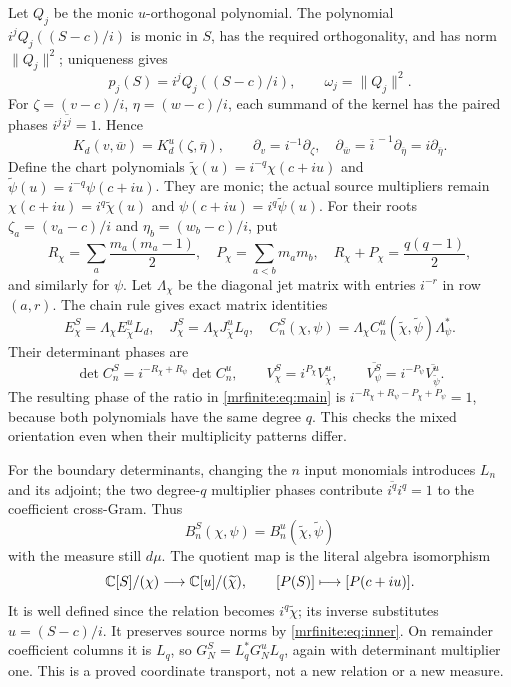 Let \(Q_j\) be the monic \(u\)-orthogonal polynomial. The polynomial
\(i^jQ_j((S-c)/i)\) is monic in \(S\), has the required
orthogonality, and has norm \(\|Q_j\|^2\); uniqueness gives
\[
 p_j(S)=i^jQ_j((S-c)/i),\qquad \omega_j=\|Q_j\|^2.
\]
For \(\zeta=(v-c)/i\), \(\eta=(w-c)/i\), each summand of the kernel
has the paired phases \(i^j\overline{i^j}=1\). Hence
\[
 K_d(v,\overline w)=K_d^u(\zeta,\overline\eta),\qquad
 \partial_v=i^{-1}\partial_\zeta,\quad
 \partial_{\overline w}=\overline{i}^{\,-1}\partial_{\overline\eta}
                         =i\partial_{\overline\eta}.
\]
Define the chart polynomials
\(\widetilde\chi(u)=i^{-q}\chi(c+iu)\) and
\(\widetilde\psi(u)=i^{-q}\psi(c+iu)\). They are monic; the actual
source multipliers remain
\(\chi(c+iu)=i^q\widetilde\chi(u)\) and
\(\psi(c+iu)=i^q\widetilde\psi(u)\).
For their roots \(\zeta_a=(v_a-c)/i\) and
\(\eta_b=(w_b-c)/i\), put
\[
 R_\chi=\sum_a\frac{m_a(m_a-1)}2,\quad
 P_\chi=\sum_{a<b}m_am_b,\quad
 R_\chi+P_\chi=\frac{q(q-1)}2,
\]
and similarly for \(\psi\). Let \(\Lambda_\chi\) be the diagonal
jet matrix with entries \(i^{-r}\) in row \((a,r)\).
The chain rule gives exact matrix identities
\begin{equation}\label{mrfinite:eq:jetphases}
 E_\chi^S=\Lambda_\chi E_{\widetilde\chi}^{u}L_d,
 \quad J_\chi^S=\Lambda_\chi J_{\widetilde\chi}^{u}L_q,
 \quad C_n^S(\chi,\psi)
       =\Lambda_\chi C_n^u(\widetilde\chi,\widetilde\psi)
                          \Lambda_\psi^*.
\end{equation}
Their determinant phases are
\[
 \det C_n^S=i^{-R_\chi+R_\psi}\det C_n^u,\qquad
 V_\chi^S=i^{P_\chi}V_{\widetilde\chi}^{u},\qquad
 \overline{V_\psi^S}=i^{-P_\psi}\overline{V_{\widetilde\psi}^{u}}.
\]
The resulting phase of the ratio in \eqref{mrfinite:eq:main} is
\(i^{-R_\chi+R_\psi-P_\chi+P_\psi}=1\), because both polynomials
have the same degree \(q\). This checks the mixed orientation even
when their multiplicity patterns differ.

For the boundary determinants, changing the \(n\) input monomials
introduces \(L_n\) and its adjoint; the two degree-\(q\) multiplier
phases contribute \(\overline{i^q}i^q=1\) to the coefficient
cross-Gram. Thus
\[
 B_n^S(\chi,\psi)=B_n^u(\widetilde\chi,\widetilde\psi)
\]
with the measure still \(d\mu\). The quotient map is the literal
algebra isomorphism
\[
 \mathbb C[S]/(\chi)\longrightarrow\mathbb C[u]/(\widetilde\chi),
 \qquad[P(S)]\longmapsto[P(c+iu)].
\]
It is well defined since the relation becomes
\(i^q\widetilde\chi\); its inverse substitutes \(u=(S-c)/i\).
It preserves source norms by \eqref{mrfinite:eq:inner}. On remainder coefficient
columns it is \(L_q\), so
\(G_N^S=L_q^*G_N^uL_q\), again with determinant multiplier one.
This is a proved coordinate transport, not a new relation or a new
measure.


